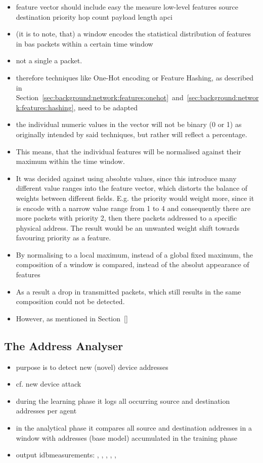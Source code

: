 \begin{itemize}
	\item feature vector should include easy the measure low-level features
		\subitem source
		\subitem destination
		\subitem priority
		\subitem hop count
		\subitem payload length
		\subitem apci
	\item (it is to note, that) a window encodes the statistical distribution of features in \gls{bas} packets within a certain time window
	\item not a single a packet.
	\item therefore techniques like One-Hot encoding or Feature Hashing, as described in Section~\ref{sec:background:network:features:onehot}~and~\ref{sec:background:network:features:hashing}, need to be adapted
	\item the individual numeric values in the vector will not be binary (0 or 1) as originally intended by said techniques, but rather will reflect a percentage.
	\item This means, that the individual features will be normalised against their maximum within the time window.
	\item It was decided against using absolute values, since this introduce many different value ranges into the feature vector, which distorts the balance of weights between different fields. E.g. the priority would weight more, since it is encode with a narrow value range from 1 to 4 and consequently there are more packets with priority 2, then there packets addressed to a specific physical address. The result would be an unwanted weight shift towards favouring priority as a feature.
	\item By normalising to a local maximum, instead of a global fixed maximum, the composition of a window is compared, instead of the absolut appearance of features
	\item As a result a drop in transmitted packets, which still results in the same composition could not be detected.
	\item However, as mentioned in Section~\ref{}
\end{itemize}

\subsection{The Address Analyser}
\label{sec:concept:anal:addr}

\begin{itemize}
	\item purpose is to detect new (novel) device addresses
	\item cf. new device attack
	\item during the learning phase it logs all occurring source and destination addresses per agent
	\item in the analytical phase it compares all source and destination addresses in a window with addresses (base model) accumulated in the training phase
	\item output \glspl{idbmeasurement}: , , , , , 
\end{itemize}

